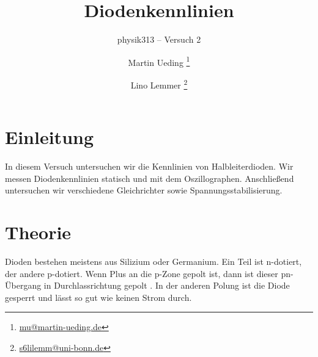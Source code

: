 




\subject{Praktikumsprotokoll}
\title{Diodenkennlinien}
\subtitle{physik313 – Versuch 2}
\author{
	Martin Ueding \footnote{\href{mailto:mu@martin-ueding.de}{mu@martin-ueding.de}}
	\and
	Lino Lemmer \footnote{\href{mailto:s6lilemm@uni-bonn.de}{s6lilemm@uni-bonn.de}}
}

\setcounter{tocdepth}{2}



\maketitle

\tableofcontents
\newpage


\section{Einleitung}

In diesem Versuch untersuchen wir die Kennlinien von Halbleiterdioden. Wir
messen Diodenkennlinien statisch und mit dem Oszillographen. Anschließend
untersuchen wir verschiedene Gleichrichter sowie Spannungsstabilisierung.


\section{Theorie}

Dioden bestehen meistens aus Silizium oder Germanium. Ein Teil ist n-dotiert,
der andere p-dotiert. Wenn Plus an die p-Zone gepolt ist, dann ist dieser
pn-Übergang in Durchlassrichtung gepolt
\cite[§~14.1]{beuth/elementare_elektronik}. In der anderen Polung ist die
Diode gesperrt und lässt so gut wie keinen Strom durch.

